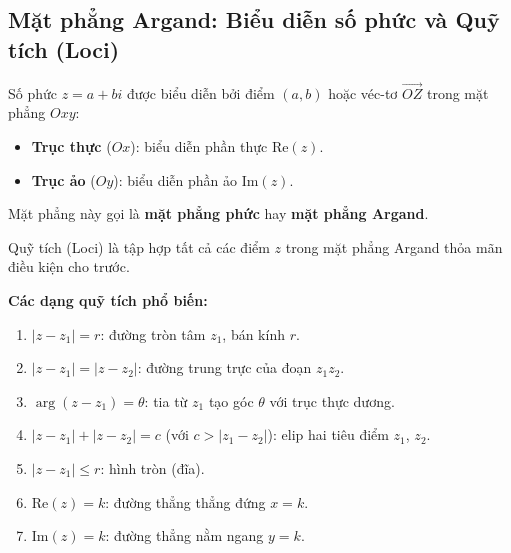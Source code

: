 \documentclass[12pt,a4paper]{article}
\begin{document}
\subsection{Mặt phẳng Argand: Biểu diễn số phức và Quỹ tích (Loci)}

\begin{dinhnghia}[title={Mặt phẳng Argand (Argand Diagram)}]
  Số phức $z = a + bi$ được biểu diễn bởi điểm $(a, b)$ hoặc véc-tơ $\overrightarrow{OZ}$ trong mặt phẳng $Oxy$:
  \begin{itemize}
    \item \textbf{Trục thực} ($Ox$): biểu diễn phần thực $\text{Re}(z)$.
    \item \textbf{Trục ảo} ($Oy$): biểu diễn phần ảo $\text{Im}(z)$.
  \end{itemize}
  Mặt phẳng này gọi là \textbf{mặt phẳng phức} hay \textbf{mặt phẳng Argand}.
\end{dinhnghia}

\begin{phuongphap}[title={Tìm quỹ tích điểm thỏa điều kiện}]
  Quỹ tích (Loci) là tập hợp tất cả các điểm $z$ trong mặt phẳng Argand thỏa mãn điều kiện cho trước.

  \textbf{Các dạng quỹ tích phổ biến:}
  \begin{enumerate}
    \item $|z - z_1| = r$: đường tròn tâm $z_1$, bán kính $r$.
    \item $|z - z_1| = |z - z_2|$: đường trung trực của đoạn $z_1 z_2$.
    \item $\arg(z - z_1) = \theta$: tia từ $z_1$ tạo góc $\theta$ với trục thực dương.
    \item $|z - z_1| + |z - z_2| = c$ (với $c > |z_1 - z_2|$): elip hai tiêu điểm $z_1$, $z_2$.
    \item $|z - z_1| \le r$: hình tròn (đĩa).
    \item $\text{Re}(z) = k$: đường thẳng thẳng đứng $x = k$.
    \item $\text{Im}(z) = k$: đường thẳng nằm ngang $y = k$.
  \end{enumerate}
\end{phuongphap}
\end{document}
